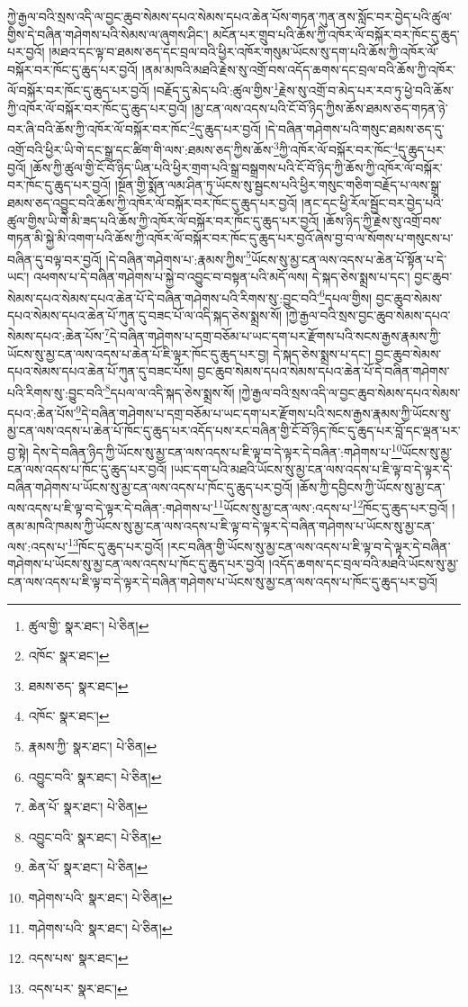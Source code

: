 ཀྱེ་རྒྱལ་བའི་སྲས་འདི་ལ་བྱང་ཆུབ་སེམས་དཔའ་སེམས་དཔའ་ཆེན་པོས་གཏན་ཀུན་ནས་སློང་བར་བྱེད་པའི་ཚུལ་གྱིས་དེ་བཞིན་གཤེགས་པའི་སེམས་ལ་ཞུགས་ཤིང་། མངོན་པར་གྲུབ་པའི་ཆོས་ཀྱི་འཁོར་ལོ་བསྐོར་བར་ཁོང་དུ་ཆུད་པར་བྱའོ། །མཐའ་དང་ལྟ་བ་ཐམས་ཅད་དང་བྲལ་བའི་ཕྱིར་འཁོར་གསུམ་ཡོངས་སུ་དག་པའི་ཆོས་ཀྱི་འཁོར་ལོ་བསྐོར་བར་ཁོང་དུ་ཆུད་པར་བྱའོ། །ནམ་མཁའི་མཐའི་རྗེས་སུ་འགྲོ་བས་འདོད་ཆགས་དང་བྲལ་བའི་ཆོས་ཀྱི་འཁོར་ལོ་བསྐོར་བར་ཁོང་དུ་ཆུད་པར་བྱའོ། །བརྗོད་དུ་མེད་པའི་:ཚུལ་གྱིས་\footnote{ཚུལ་གྱི་  སྣར་ཐང་།  པེ་ཅིན། }རྗེས་སུ་འགྲོ་བ་མེད་པར་རབ་ཏུ་ཕྱེ་བའི་ཆོས་ཀྱི་འཁོར་ལོ་བསྐོར་བར་ཁོང་དུ་ཆུད་པར་བྱའོ། །མྱ་ངན་ལས་འདས་པའི་ངོ་བོ་ཉིད་ཀྱིས་ཆོས་ཐམས་ཅད་གཏན་ཉེ་བར་ཞི་བའི་ཆོས་ཀྱི་འཁོར་ལོ་བསྐོར་བར་ཁོང་\footnote{འཁོང་  སྣར་ཐང་། }དུ་ཆུད་པར་བྱའོ། །དེ་བཞིན་གཤེགས་པའི་གསུང་ཐམས་ཅད་དུ་འགྲོ་བའི་ཕྱིར་ཡི་གེ་དང་སྒྲ་དང་ཚིག་གི་ལས་:ཐམས་ཅད་ཀྱིས་ཆོས་\footnote{ཐམས་ཅད་  སྣར་ཐང་། }ཀྱི་འཁོར་ལོ་བསྐོར་བར་ཁོང་\footnote{འཁོང་  སྣར་ཐང་། }དུ་ཆུད་པར་བྱའོ། །ཆོས་ཀྱི་ཚུལ་གྱི་ངོ་བོ་ཉིད་ཡིན་པའི་ཕྱིར་གྲག་པའི་སྒྲ་བསྒྲགས་པའི་ངོ་བོ་ཉིད་ཀྱི་ཆོས་ཀྱི་འཁོར་ལོ་བསྐོར་བར་ཁོང་དུ་ཆུད་པར་བྱའོ། །སྔོན་གྱི་སྨོན་ལམ་ཤིན་ཏུ་ཡོངས་སུ་སྦྱངས་པའི་ཕྱིར་གསུང་གཅིག་བརྗོད་པ་ལས་སྒྲ་ཐམས་ཅད་འབྱུང་བའི་ཆོས་ཀྱི་འཁོར་ལོ་བསྐོར་བར་ཁོང་དུ་ཆུད་པར་བྱའོ། །ནང་དང་ཕྱི་རོལ་སྦྱོང་བར་བྱེད་པའི་ཚུལ་གྱིས་ཡི་གེ་མི་ཟད་པའི་ཆོས་ཀྱི་འཁོར་ལོ་བསྐོར་བར་ཁོང་དུ་ཆུད་པར་བྱའོ། །ཆོས་ཉིད་ཀྱི་རྗེས་སུ་འགྲོ་བས་གཏན་མི་སྐྱེ་མི་འགག་པའི་ཆོས་ཀྱི་འཁོར་ལོ་བསྐོར་བར་ཁོང་དུ་ཆུད་པར་བྱའོ་ཞེས་བྱ་བ་ལ་སོགས་པ་གསུངས་པ་བཞིན་དུ་བལྟ་བར་བྱའོ། །དེ་བཞིན་གཤེགས་པ་:རྣམས་ཀྱིས་\footnote{རྣམས་ཀྱི་  སྣར་ཐང་།  པེ་ཅིན། }ཡོངས་སུ་མྱ་ངན་ལས་འདས་པ་ཆེན་པོ་སྟོན་པ་དེ་ཡང་། འཕགས་པ་དེ་བཞིན་གཤེགས་པ་སྐྱེ་བ་འབྱུང་བ་བསྟན་པའི་མདོ་ལས། དེ་སྐད་ཅེས་སྨྲས་པ་དང་། བྱང་ཆུབ་སེམས་དཔའ་སེམས་དཔའ་ཆེན་པོ་དེ་བཞིན་གཤེགས་པའི་རིགས་སུ་:བྱུང་བའི་\footnote{འབྱུང་བའི་  སྣར་ཐང་།  པེ་ཅིན། }དཔལ་གྱིས། བྱང་ཆུབ་སེམས་དཔའ་སེམས་དཔའ་ཆེན་པོ་ཀུན་དུ་བཟང་པོ་ལ་འདི་སྐད་ཅེས་སྨྲས་སོ། །ཀྱེ་རྒྱལ་བའི་སྲས་བྱང་ཆུབ་སེམས་དཔའ་སེམས་དཔའ་:ཆེན་པོས་\footnote{ཆེན་པོ་  སྣར་ཐང་།  པེ་ཅིན། }དེ་བཞིན་གཤེགས་པ་དགྲ་བཅོམ་པ་ཡང་དག་པར་རྫོགས་པའི་སངས་རྒྱས་རྣམས་ཀྱི་ཡོངས་སུ་མྱ་ངན་ལས་འདས་པ་ཆེན་པོ་ཇི་ལྟར་ཁོང་དུ་ཆུད་པར་བྱ། དེ་སྐད་ཅེས་སྨྲས་པ་དང་། བྱང་ཆུབ་སེམས་དཔའ་སེམས་དཔའ་ཆེན་པོ་ཀུན་དུ་བཟང་པོས། བྱང་ཆུབ་སེམས་དཔའ་སེམས་དཔའ་ཆེན་པོ་དེ་བཞིན་གཤེགས་པའི་རིགས་སུ་:བྱུང་བའི་\footnote{འབྱུང་བའི་  སྣར་ཐང་།  པེ་ཅིན། }དཔལ་ལ་འདི་སྐད་ཅེས་སྨྲས་སོ། །ཀྱེ་རྒྱལ་བའི་སྲས་འདི་ལ་བྱང་ཆུབ་སེམས་དཔའ་སེམས་དཔའ་:ཆེན་པོས་\footnote{ཆེན་པོ་  སྣར་ཐང་།  པེ་ཅིན། }དེ་བཞིན་གཤེགས་པ་དགྲ་བཅོམ་པ་ཡང་དག་པར་རྫོགས་པའི་སངས་རྒྱས་རྣམས་ཀྱི་ཡོངས་སུ་མྱ་ངན་ལས་འདས་པ་ཆེན་པོ་ཁོང་དུ་ཆུད་པར་འདོད་པས་རང་བཞིན་གྱི་ངོ་བོ་ཉིད་ཁོང་དུ་ཆུད་པར་བློ་དང་ལྡན་པར་བྱ་སྟེ། དེས་དེ་བཞིན་ཉིད་ཀྱི་ཡོངས་སུ་མྱ་ངན་ལས་འདས་པ་ཇི་ལྟ་བ་དེ་ལྟར་དེ་བཞིན་:གཤེགས་པ་\footnote{གཤེགས་པའི་  སྣར་ཐང་།  པེ་ཅིན། }ཡོངས་སུ་མྱ་ངན་ལས་འདས་པ་ཁོང་དུ་ཆུད་པར་བྱའོ། །ཡང་དག་པའི་མཐའི་ཡོངས་སུ་མྱ་ངན་ལས་འདས་པ་ཇི་ལྟ་བ་དེ་ལྟར་དེ་བཞིན་གཤེགས་པ་ཡོངས་སུ་མྱ་ངན་ལས་འདས་པ་ཁོང་དུ་ཆུད་པར་བྱའོ། །ཆོས་ཀྱི་དབྱིངས་ཀྱི་ཡོངས་སུ་མྱ་ངན་ལས་འདས་པ་ཇི་ལྟ་བ་དེ་ལྟར་དེ་བཞིན་:གཤེགས་པ་\footnote{གཤེགས་པའི་  སྣར་ཐང་།  པེ་ཅིན། }ཡོངས་སུ་མྱ་ངན་ལས་:འདས་པ་\footnote{འདས་པས་  སྣར་ཐང་། }ཁོང་དུ་ཆུད་པར་བྱའོ། །ནམ་མཁའི་ཁམས་ཀྱི་ཡོངས་སུ་མྱ་ངན་ལས་འདས་པ་ཇི་ལྟ་བ་དེ་ལྟར་དེ་བཞིན་གཤེགས་པ་ཡོངས་སུ་མྱ་ངན་ལས་:འདས་པ་\footnote{འདས་པར་  སྣར་ཐང་། }ཁོང་དུ་ཆུད་པར་བྱའོ། །རང་བཞིན་གྱི་ཡོངས་སུ་མྱ་ངན་ལས་འདས་པ་ཇི་ལྟ་བ་དེ་ལྟར་དེ་བཞིན་གཤེགས་པ་ཡོངས་སུ་མྱ་ངན་ལས་འདས་པ་ཁོང་དུ་ཆུད་པར་བྱའོ། །འདོད་ཆགས་དང་བྲལ་བའི་མཐའི་ཡོངས་སུ་མྱ་ངན་ལས་འདས་པ་ཇི་ལྟ་བ་དེ་ལྟར་དེ་བཞིན་གཤེགས་པ་ཡོངས་སུ་མྱ་ངན་ལས་འདས་པ་ཁོང་དུ་ཆུད་པར་བྱའོ། 